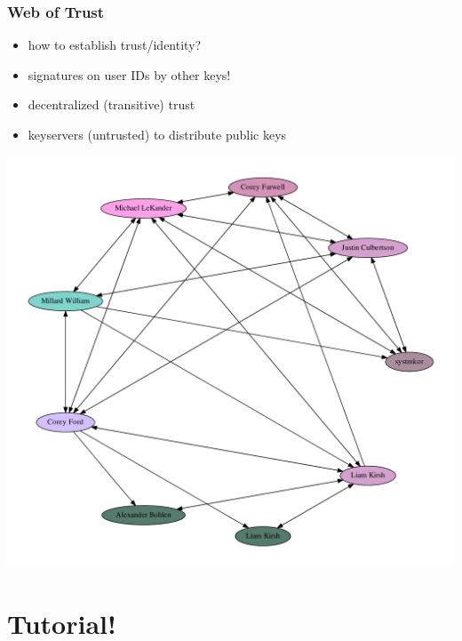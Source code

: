 \documentclass{beamer}
\begin{document}
\begin{frame}
  \frametitle{Web of Trust}

  \begin{itemize}
    \item how to establish trust/identity?
    \item signatures on user IDs by other keys!
    \item decentralized (transitive) trust
    \item keyservers (untrusted) to distribute public keys
  \end{itemize}

  \includegraphics[height=0.5\textheight]{sigs}

\end{frame}


\section{Tutorial!}
\end{document}
